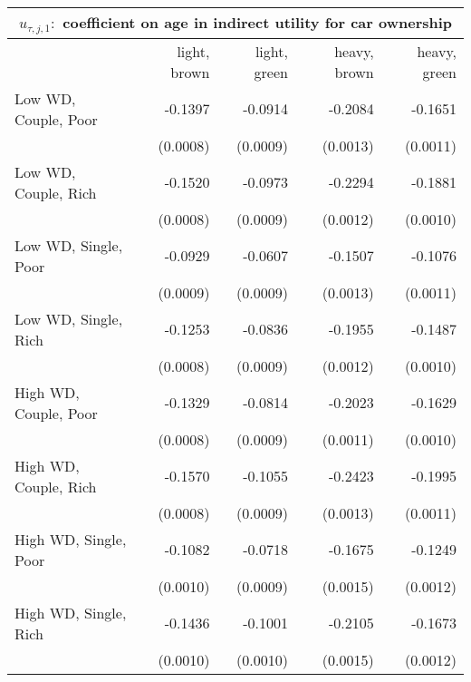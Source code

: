 \begin{tabular}{lrrrr} 
\toprule 
\multicolumn{5}{c}{$u_{\tau,j,1} : $ coefficient on age in indirect utility for car ownership} \\ 
\midrule
                                & light, brown   & light, green   & heavy, brown   & heavy, green  \\ 
\midrule 
          Low WD, Couple, Poor  &      -0.1397   &      -0.0914   &      -0.2084   &      -0.1651  \\ 
                                & (0.0008)   & (0.0009)   & (0.0013)   & (0.0011)  \\ 
          Low WD, Couple, Rich  &      -0.1520   &      -0.0973   &      -0.2294   &      -0.1881  \\ 
                                & (0.0008)   & (0.0009)   & (0.0012)   & (0.0010)  \\ 
          Low WD, Single, Poor  &      -0.0929   &      -0.0607   &      -0.1507   &      -0.1076  \\ 
                                & (0.0009)   & (0.0009)   & (0.0013)   & (0.0011)  \\ 
          Low WD, Single, Rich  &      -0.1253   &      -0.0836   &      -0.1955   &      -0.1487  \\ 
                                & (0.0008)   & (0.0009)   & (0.0012)   & (0.0010)  \\ 
         High WD, Couple, Poor  &      -0.1329   &      -0.0814   &      -0.2023   &      -0.1629  \\ 
                                & (0.0008)   & (0.0009)   & (0.0011)   & (0.0010)  \\ 
         High WD, Couple, Rich  &      -0.1570   &      -0.1055   &      -0.2423   &      -0.1995  \\ 
                                & (0.0008)   & (0.0009)   & (0.0013)   & (0.0011)  \\ 
         High WD, Single, Poor  &      -0.1082   &      -0.0718   &      -0.1675   &      -0.1249  \\ 
                                & (0.0010)   & (0.0009)   & (0.0015)   & (0.0012)  \\ 
         High WD, Single, Rich  &      -0.1436   &      -0.1001   &      -0.2105   &      -0.1673  \\ 
                                & (0.0010)   & (0.0010)   & (0.0015)   & (0.0012)  \\ 
\bottomrule \end{tabular} 
